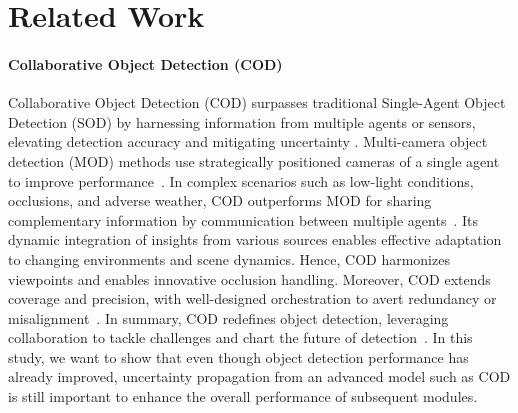 \section{Related Work}
\label{sec:relatedwork}





\paragraph{Collaborative Object Detection (COD)}\label{subsec:cod}
Collaborative Object Detection (COD) surpasses traditional Single-Agent Object Detection (SOD) by harnessing information from multiple agents or sensors, elevating detection accuracy \cite{li2022v2x, xu2022opencood, cai2022analyzing} and mitigating uncertainty \cite{Su2022uncertainty}. Multi-camera object detection (MOD) \cite{jiang2023polarformer} methods use strategically positioned cameras of a single agent to improve performance~\cite{jiang2023polarformer}. In complex scenarios such as low-light conditions, occlusions, and adverse weather, COD outperforms MOD for sharing complementary information by communication between multiple agents~\cite{hu2022where2comm}. Its dynamic integration of insights from various sources enables effective adaptation to changing environments and scene dynamics. Hence, COD harmonizes viewpoints and enables innovative occlusion handling. Moreover, COD extends coverage and precision, with well-designed orchestration to avert redundancy or misalignment~\cite{li2022v2x}. In summary, COD redefines object detection, leveraging collaboration to tackle challenges and chart the future of detection~\cite{xu2022v2x}. 
In this study, we want to show that even though object detection performance has already improved, uncertainty propagation from an advanced model such as COD is still important to enhance the overall performance of subsequent modules.


